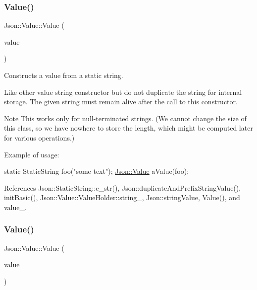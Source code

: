 \subsubsection{\texorpdfstring{Value()}{Value()}\hspace{0.1cm}{\footnotesize\ttfamily [9/12]}}
{\footnotesize\ttfamily Json\+::\+Value\+::\+Value (\begin{DoxyParamCaption}\item[{const \hyperlink{classJson_1_1StaticString}{Static\+String} \&}]{value }\end{DoxyParamCaption})}



Constructs a value from a static string. 

Like other value string constructor but do not duplicate the string for internal storage. The given string must remain alive after the call to this constructor. \begin{DoxyNote}{Note}
This works only for null-\/terminated strings. (We cannot change the size of this class, so we have nowhere to store the length, which might be computed later for various operations.)
\end{DoxyNote}
Example of usage\+: 
\begin{DoxyCode}
\textcolor{keyword}{static} StaticString foo(\textcolor{stringliteral}{"some text"});
\hyperlink{classJson_1_1Value}{Json::Value} aValue(foo);
\end{DoxyCode}
 

References Json\+::\+Static\+String\+::c\+\_\+str(), Json\+::duplicate\+And\+Prefix\+String\+Value(), init\+Basic(), Json\+::\+Value\+::\+Value\+Holder\+::string\+\_\+, Json\+::string\+Value, Value(), and value\+\_\+.

\mbox{\label{classJson_1_1Value_a89ef37969ff7c6eb3a7afcca03d4cd4a_a89ef37969ff7c6eb3a7afcca03d4cd4a}} 
\subsubsection{\texorpdfstring{Value()}{Value()}\hspace{0.1cm}{\footnotesize\ttfamily [10/12]}}
{\footnotesize\ttfamily Json\+::\+Value\+::\+Value (\begin{DoxyParamCaption}\item[{const \hyperlink{json_8h_a1e723f95759de062585bc4a8fd3fa4be_a1e723f95759de062585bc4a8fd3fa4be}{J\+S\+O\+N\+C\+P\+P\+\_\+\+S\+T\+R\+I\+NG} \&}]{value }\end{DoxyParamCaption})}



